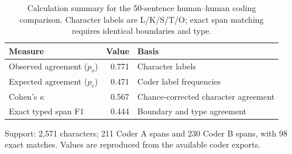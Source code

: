 \begin{table}[htbp]
\caption{Calculation summary for the 50-sentence human--human coding comparison. Character labels are L/K/S/T/O; exact span matching requires identical boundaries and type.}
\label{tab:iaa50}
\centering\small
\renewcommand{\arraystretch}{1.15}
\begin{tabularx}{\linewidth}{@{}LrL@{}}
\toprule
Measure & Value & Basis \\
\midrule
Observed agreement ($p_o$) & 0.771 & Character labels \\
Expected agreement ($p_e$) & 0.471 & Coder label frequencies \\
Cohen's $\kappa$ & 0.567 & Chance-corrected character agreement \\
Exact typed span F1 & 0.444 & Boundary and type agreement \\
\bottomrule
\end{tabularx}
\par\smallskip\footnotesize\RaggedRight
Support: 2,571 characters; 211 Coder A spans and 230 Coder B spans, with 98 exact matches. Values are reproduced from the available coder exports.
\end{table}
